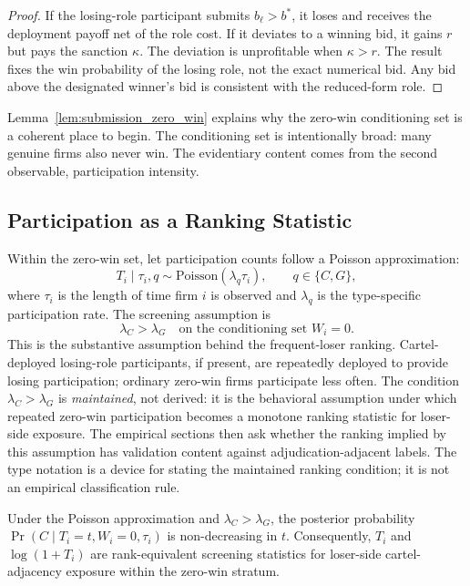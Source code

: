 \begin{proof}
If the losing-role participant submits $b_\ell>b^*$, it loses
and receives the deployment payoff net of the role cost. If it
deviates to a winning bid, it gains $r$ but pays the sanction
$\kappa$. The deviation is unprofitable when $\kappa>r$. The
result fixes the win probability of the losing role, not the
exact numerical bid. Any bid above the designated winner's bid is
consistent with the reduced-form role. 
\end{proof}

Lemma~\ref{lem:submission_zero_win} explains why the zero-win
conditioning set is a coherent place to begin. The conditioning
set is intentionally broad: many genuine firms also never win.
The evidentiary content comes from the second observable,
participation intensity.

\subsection{Participation as a Ranking Statistic}
\label{app:framework_participation}

Within the zero-win set, let participation counts follow a
Poisson approximation:
\[
  T_i \mid \tau_i, q \sim \text{Poisson}(\lambda_q \tau_i),
  \qquad q\in\{C,G\},
\]
where $\tau_i$ is the length of time firm $i$ is observed and
$\lambda_q$ is the type-specific participation rate. The
screening assumption is
\[
  \lambda_C>\lambda_G
  \quad\text{on the conditioning set } W_i=0.
\]
This is the substantive assumption behind the frequent-loser
ranking. Cartel-deployed losing-role participants, if present,
are repeatedly deployed to provide losing participation; ordinary
zero-win firms participate less often.
The condition $\lambda_C>\lambda_G$ is \emph{maintained}, not
derived: it is the behavioral assumption under which repeated
zero-win participation becomes a monotone ranking statistic for
loser-side exposure. The empirical sections then ask whether
the ranking implied by this assumption has validation content
against adjudication-adjacent labels.
The type notation is a device for stating the maintained ranking
condition; it is not an empirical classification rule.

\begin{proposition}
\label{prop:submission_monotone}
Under the Poisson approximation and $\lambda_C>\lambda_G$, the
posterior probability $\Pr(C\mid T_i=t,W_i=0,\tau_i)$ is
non-decreasing in $t$. Consequently, $T_i$ and
$\log(1+T_i)$ are rank-equivalent screening statistics for
loser-side cartel-adjacency exposure within the zero-win
stratum.
\end{proposition}

